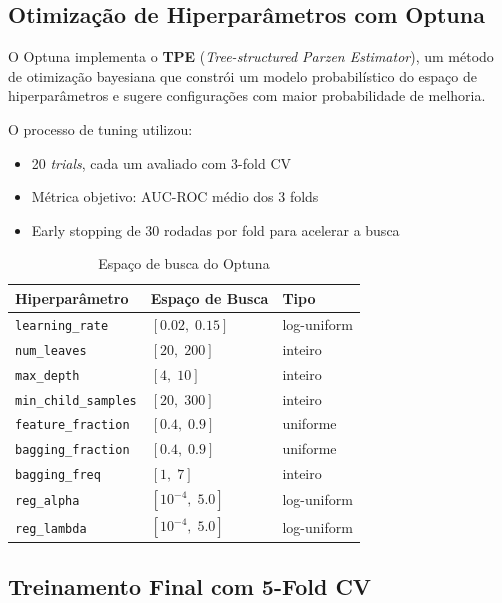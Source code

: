 \documentclass[12pt, a4paper]{article}
\begin{document}
\subsection{Otimiza\c{c}\~ao de Hiperpar\^ametros com Optuna}

O Optuna implementa o \textbf{TPE} (\textit{Tree-structured Parzen Estimator}), um
m\'etodo de otimiza\c{c}\~ao bayesiana que constr\'oi um modelo probabil\'istico do
espa\c{c}o de hiperpar\^ametros e sugere configura\c{c}\~oes com maior probabilidade
de melhoria.

O processo de tuning utilizou:
\begin{itemize}
    \item 20 \textit{trials}, cada um avaliado com 3-fold CV
    \item M\'etrica objetivo: AUC-ROC m\'edio dos 3 folds
    \item Early stopping de 30 rodadas por fold para acelerar a busca
\end{itemize}

\begin{table}[H]
\centering
\begin{tabular}{lll}
\toprule
\textbf{Hiperpar\^ametro} & \textbf{Espa\c{c}o de Busca} & \textbf{Tipo} \\
\midrule
\texttt{learning\_rate}       & $[0.02,\; 0.15]$          & log-uniform \\
\texttt{num\_leaves}          & $[20,\; 200]$             & inteiro \\
\texttt{max\_depth}           & $[4,\; 10]$               & inteiro \\
\texttt{min\_child\_samples}  & $[20,\; 300]$             & inteiro \\
\texttt{feature\_fraction}    & $[0.4,\; 0.9]$            & uniforme \\
\texttt{bagging\_fraction}    & $[0.4,\; 0.9]$            & uniforme \\
\texttt{bagging\_freq}        & $[1,\; 7]$                & inteiro \\
\texttt{reg\_alpha}           & $[10^{-4},\; 5.0]$        & log-uniform \\
\texttt{reg\_lambda}          & $[10^{-4},\; 5.0]$        & log-uniform \\
\bottomrule
\end{tabular}
\caption{Espa\c{c}o de busca do Optuna}
\end{table}

\subsection{Treinamento Final com 5-Fold CV}
\end{document}
